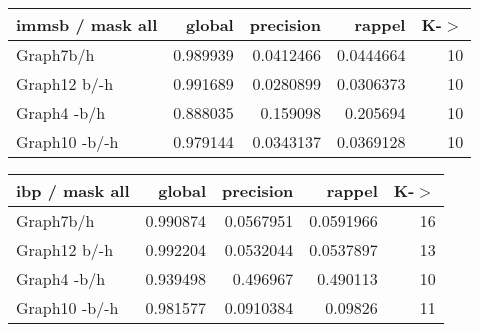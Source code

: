 \begin{table*} 
	\begin{minipage}[h]{0.45\linewidth} 
\begin{tabular}{lrrrr}
\hline
 immsb / mask all   &   global &   precision &    rappel &   K-\ensuremath{>} \\
\hline
 Graph7b/h          & 0.989939 &   0.0412466 & 0.0444664 &    10 \\
 Graph12 b/-h       & 0.991689 &   0.0280899 & 0.0306373 &    10 \\
 Graph4 -b/h        & 0.888035 &   0.159098  & 0.205694  &    10 \\
 Graph10 -b/-h      & 0.979144 &   0.0343137 & 0.0369128 &    10 \\
\hline
\end{tabular}
\end{minipage}
\hspace{0.5cm}
\begin{minipage}[h]{0.45\linewidth}
\begin{tabular}{lrrrr}
\hline
 ibp / mask all   &   global &   precision &    rappel &   K-\ensuremath{>} \\
\hline
 Graph7b/h        & 0.990874 &   0.0567951 & 0.0591966 &    16 \\
 Graph12 b/-h     & 0.992204 &   0.0532044 & 0.0537897 &    13 \\
 Graph4 -b/h      & 0.939498 &   0.496967  & 0.490113  &    10 \\
 Graph10 -b/-h    & 0.981577 &   0.0910384 & 0.09826   &    11 \\
\hline
\end{tabular}
\end{minipage}
\end{table*}


